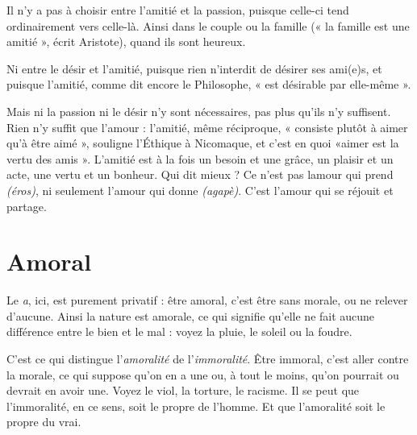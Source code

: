 Il n’y a pas à choisir entre l'amitié et la passion, puisque celle-ci tend ordinairement
vers celle-là. Ainsi dans le couple ou la famille (« la famille est une
amitié », écrit Aristote), quand ils sont heureux.

Ni entre le désir et l'amitié, puisque rien n’interdit de désirer ses ami(e)s, et
puisque l'amitié, comme dit encore le Philosophe, « est désirable par elle-même ».

Mais ni la passion ni le désir n’y sont nécessaires, pas plus qu’ils n’y suffisent.
Rien n’y suffit que l’amour : l’amitié, même réciproque, « consiste plutôt
à aimer qu’à être aimé », souligne l’{\it }Éthique à Nicomaque, et c'est en quoi
«aimer est la vertu des amis ». L'amitié est à la fois un besoin et une grâce, un
plaisir et un acte, une vertu et un bonheur. Qui dit mieux ? Ce n'est pas
lamour qui prend {\it (éros)}, ni seulement l'amour qui donne {\it (agapè)}. C'est
l'amour qui se réjouit et partage.

\section{Amoral}
Le {\it a}, ici, est purement privatif : être amoral, c’est être sans morale,
ou ne relever d’aucune. Ainsi la nature est amorale, ce qui signifie
qu’elle ne fait aucune différence entre le bien et le mal : voyez la pluie, le soleil
ou la foudre.

C’est ce qui distingue l’{\it amoralité} de l’{\it immoralité}. Être immoral, c’est aller
contre la morale, ce qui suppose qu’on en a une ou, à tout le moins, qu'on
pourrait ou devrait en avoir une. Voyez le viol, la torture, le racisme. Il se peut
que l’immoralité, en ce sens, soit le propre de l’homme. Et que l’amoralité soit
le propre du vrai.

